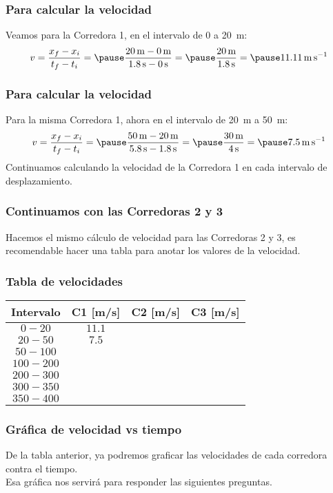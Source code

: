 \documentclass[14pt]{beamer}
\begin{document}
\begin{frame}
\frametitle{Para calcular la velocidad}
Veamos para la Corredora 1, en el intervalo de $0$ a \SI{20}{\meter}:
\pause
\begin{eqnarray*}
\begin{aligned}
v = \dfrac{x_{f} - x_{i}}{t_{f} - t_{i}} = \pause \dfrac{\SI{20}{\meter} - \SI{0}{\meter}}{\SI{1.8}{\second} - \SI{0}{\second}} = \pause \dfrac{\SI{20}{\meter}}{\SI{1.8}{\second}} = \pause \SI{11.11}{\meter\per\second}
\end{aligned}
\end{eqnarray*}
\end{frame}
\begin{frame}
\frametitle{Para calcular la velocidad}
Para la misma Corredora 1, ahora en el intervalo de \SI{20}{\meter} a \SI{50}{\meter}:
\pause
\begin{eqnarray*}
\begin{aligned}
v = \dfrac{x_{f} - x_{i}}{t_{f} - t_{i}} = \pause \dfrac{\SI{50}{\meter} - \SI{20}{\meter}}{\SI{5.8}{\second} - \SI{1.8}{\second}} = \pause \dfrac{\SI{30}{\meter}}{\SI{4}{\second}} = \pause \SI{7.5}{\meter\per\second}
\end{aligned}
\end{eqnarray*}
\pause
Continuamos calculando la velocidad de la Corredora 1 en cada intervalo de desplazamiento.
\end{frame}
\begin{frame}
\frametitle{Continuamos con las Corredoras 2 y 3}
Hacemos el mismo cálculo de velocidad para las Corredoras 2 y 3, es recomendable hacer una tabla para anotar los valores de la velocidad.
\end{frame}
\begin{frame}
\frametitle{Tabla de velocidades}
\begin{table}
\centering
\small
\renewcommand{\arraystretch}{1}
\begin{tabular}{c | c | c | c }
Intervalo & C1 [m/s] & C2 [m/s] & C3 [m/s] \\ \hline
$0 - 20$ & $11.1$ & & \\ \hline
$20 - 50$ & $7.5$ & & \\ \hline
$50 - 100$ & & & \\ \hline
$100 - 200$ & & & \\ \hline
$200 - 300$ & & & \\ \hline
$300 - 350$ & & & \\ \hline
$350 - 400$ & & & \\ \hline
\end{tabular}
\end{table}
\end{frame}
\begin{frame}
\frametitle{Gráfica de velocidad vs tiempo}
De la tabla anterior, ya podremos graficar las velocidades de cada corredora contra el tiempo.
\\
\bigskip
\pause
Esa gráfica nos servirá para responder las siguientes preguntas.
\end{frame}
\end{document}
